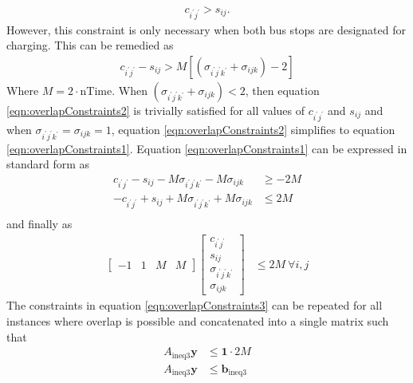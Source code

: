 \begin{align}\label{eqn:overlapConstraints1}
c_{i^{'}j^{'}} > s_{ij}.
\end{align}
However, this constraint is only necessary when both bus stops are designated for charging. This can be remedied as
	\begin{align}\label{eqn:overlapConstraints2}
		c_{i^{'}j^{'}} - s_{ij} > M\left[(\sigma_{i^{'}j^{'}k^{'}} + \sigma_{ijk}) - 2\right]
	\end{align}
	Where $M = 2\cdot\text{nTime}$. When $(\sigma_{i^{'}j^{'}k^{'}} + \sigma_{ijk}) < 2$, then equation \ref{eqn:overlapConstraints2} is trivially satisfied for all values of $c_{i^{'}j^{'}}$ and $s_{ij}$ and when $\sigma_{i^{'}j^{'}k^{'}} = \sigma_{ijk} = 1$, equation \ref{eqn:overlapConstraints2} simplifies to equation \ref{eqn:overlapConstraints1}. Equation \ref{eqn:overlapConstraints1} can be expressed in standard form as 
	\begin{equation}\label{eqn:overlapConstraints3}\begin{aligned}
		c_{i^{'}j^{'}} - s_{ij} - M\sigma_{i^{'}j^{'}k^{'}} - M\sigma_{ijk} &\ge -2M \\
		-c_{i^{'}j^{'}} + s_{ij} + M\sigma_{i^{'}j^{'}k^{'}} + M\sigma_{ijk} &\le 2M \\
	\end{aligned}\end{equation}
	and finally as
	\begin{equation}\begin{aligned} 
		\begin{bmatrix} -1 & 1 & M & M\end{bmatrix} \begin{bmatrix}c_{i^{'}j^{'}}\\ s_{ij} \\ \sigma_{i^{'}j^{'}k^{'}}\\ \sigma_{ijk} \end{bmatrix} &\le 2M \ \forall i,j
	\end{aligned} \end{equation}
	The constraints in equation \ref{eqn:overlapConstraints3} can be repeated for all instances where overlap is possible and concatenated into a single matrix such that
	\begin{equation}\begin{aligned} 
		A_{\text{ineq3}}\mathbf{y} &\le \mathbf{1}\cdot 2M \\
		A_{\text{ineq3}}\mathbf{y} & \le \mathbf{b}_{\text{ineq3}}\\
	\end{aligned} \end{equation} 
